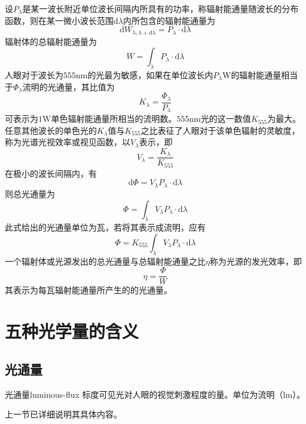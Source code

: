 \documentclass[cn,10pt,chinesefont=founder,math=newtx,cite=super,twoside]{elegantbook}
\begin{document}
设$P_\lambda$是某一波长附近单位波长间隔内所具有的功率，称辐射能通量随波长的分布函数，则在某一微小波长范围$\mathrm{d}\lambda$内所包含的辐射能通量为
\begin{equation}
\mathrm{d}W_{\lambda,\lambda+\mathrm{d}\lambda}=P_{\lambda}\cdot\mathrm{d}\lambda
\end{equation}
辐射体的总辐射能通量为
\begin{equation}
W=\int_{\lambda} P_{\lambda}\cdot\mathrm{d}\lambda
\end{equation}
人眼对于波长为$555\mathrm{nm}$的光最为敏感，如果在单位波长内$P_{\lambda}\mathrm{W}$的辐射能通量相当于$\varPhi_{\lambda}$流明的光通量，其比值为
\begin{equation}
K_{\lambda}=\frac{\varPhi_{\lambda}}{P_{\lambda}}
\end{equation}
可表示为$1\mathrm{W}$单色辐射能通量所相当的流明数。$555\mathrm{nm}$光的这一数值$K_{555}$为最大。任意其他波长的单色光的$K_{\lambda}$值与$K_{555}$之比表征了人眼对于该单色辐射的灵敏度，称为光谱光视效率或视见函数，以$V_{\lambda}$表示，即
\begin{equation}
V_{\lambda}=\frac{K_{\lambda}}{K_{555}}
\end{equation}
在极小的波长间隔内，有
\begin{equation}
\mathrm{d}\varPhi=V_{\lambda}P_{\lambda}\cdot\mathrm{d}\lambda
\end{equation}
则总光通量为
\begin{equation}
\varPhi=\int_{\lambda}V_{\lambda}P_{\lambda}\cdot\mathrm{d}\lambda
\end{equation}
此式给出的光通量单位为瓦，若将其表示成流明，应有
\begin{equation}
\varPhi=K_{555}\int_{\lambda}V_{\lambda}P_{\lambda}\cdot\mathrm{d}\lambda
\end{equation}
一个辐射体或光源发出的总光通量与总辐射能通量之比$\eta$称为光源的发光效率，即
\begin{equation}
\eta=\frac{\varPhi}{W}
\end{equation}
其表示为每瓦辐射能通量所产生的的光通量。

\section{五种光学量的含义}

\subsection{光通量}
\begin{definition}{光通量}{luminous-flux}
标度可见光对人眼的视觉刺激程度的量。单位为流明（$\mathrm{lm}$）。
\end{definition}
上一节已详细说明其具体内容。
\end{document}
